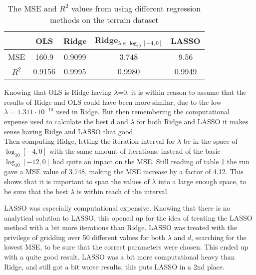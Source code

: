 \documentclass[../main.tex]{subfiles}
\begin{document}
\begin{table}[H]
\centering
\caption{The MSE and $R^2$ values from using different regression methods on the terrain dataset}
\begin{tabular}{ ccccc } 
 \toprule
  & OLS & Ridge &Ridge$_{\lambda \in \log_{10}[-4,0]}$ & LASSO \\ 
 \midrule
 MSE & 160.9 & 0.9099 & 3.748 & 9.56\\
 
 $R^2$ & 0.9156 & 0.9995& 0.9980 & 0.9949 \\ 
 \bottomrule
\end{tabular}
\label{tab:statistical_results}
\end{table}

Knowing that OLS is Ridge having $\lambda$=0, it is within reason to assume that the results of Ridge and OLS could have been more similar, due to the low $\lambda=1.311\cdot10^{-10}$ used in Ridge. But then remembering the computational expense used to calculate the best d and $\lambda$ for both Ridge and LASSO it makes sense having Ridge and LASSO that good.\\

Then computing Ridge, letting the iteration interval for $\lambda$ be in the space of $\log_{10}[-4,0]$ with the same amount of iterations, instead of the basic $\log_{10}[-12,0]$ had quite an inpact on the MSE. Still reading of table \ref{tab:statistical_results} the run gave a MSE value of 3.748, making the MSE increase by a factor of 4.12. This shows that it is important to span the values of $\lambda$ into a large enough space, to be sure that the best $\lambda$ is within reach of the interval.

LASSO was especially computational expensive. Knowing that there is no analytical solution to LASSO, this opened up for the idea of treating the LASSO method with a bit more iterations than Ridge. LASSO was treated with the privilege of gridding over 50 different values for both $\lambda$ and $d$, searching for the lowest MSE, to be sure that the correct parameters were chosen. This ended up with a quite good result. LASSO was a bit more computational heavy than Ridge, and still got a bit worse results, this puts LASSO in a 2nd place.
\end{document}
